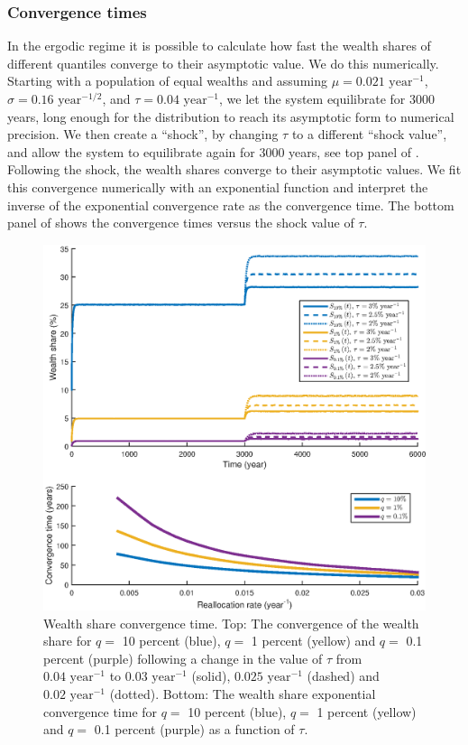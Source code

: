 \subsubsection{Convergence times}
In the ergodic regime it is possible to calculate how fast the wealth shares of different quantiles converge to their asymptotic value. We do this numerically. Starting with a population of equal wealths and assuming $\mu=0.021 \text{ year}^{-1}$, $\sigma=0.16 \text{ year}^{-1/2}$, and $\tau = 0.04\text{ year}^{-1}$, we let the system equilibrate for 3000 years, long enough for the distribution to reach its asymptotic form to numerical precision. We then create a ``shock'', by changing $\tau$ to a different ``shock value'', and allow the system to equilibrate again for 3000 years, see top panel of . Following the shock, the wealth shares converge to their asymptotic values. We fit this convergence numerically with an exponential function and interpret the inverse of the exponential convergence rate as the convergence time. The bottom panel of   shows the convergence times versus the shock value of $\tau$.

\begin{figure}[!htb]
\centering
\includegraphics[width=1.0\textwidth] {./chapter_3/figs/convergence.eps}
\caption{Wealth share convergence time. Top: The convergence of the wealth share for $q=$ 10 percent (blue), $q=$ 1 percent (yellow) and $q=$ 0.1 percent (purple) following a change in the value of $\tau$ from $0.04\text{ year}^{-1}$ to $0.03\text{ year}^{-1}$ (solid), $0.025\text{ year}^{-1}$ (dashed) and $0.02\text{ year}^{-1}$ (dotted). Bottom: The wealth share exponential convergence time for $q=$ 10 percent (blue), $q=$ 1 percent (yellow) and $q=$ 0.1 percent (purple) as a function of $\tau$.}
\end{figure}

